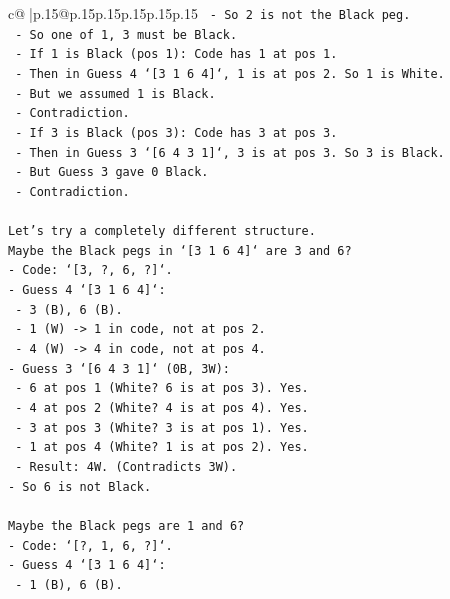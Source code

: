 \documentclass{article}
\begin{document}
{\begin{supertabular}{c@{$\;$}|p{.15\linewidth}@{}p{.15\linewidth}p{.15\linewidth}p{.15\linewidth}p{.15\linewidth}p{.15\linewidth}}
{{{\texttt{    {-} So 2 is not the Black peg.} \\
\texttt{    {-} So one of 1, 3 must be Black.} \\
\texttt{    {-} If 1 is Black (pos 1): Code has 1 at pos 1.} \\
\texttt{      {-} Then in Guess 4 `{[}3 1 6 4{]}`, 1 is at pos 2. So 1 is White.} \\
\texttt{      {-} But we assumed 1 is Black.} \\
\texttt{      {-} Contradiction.} \\
\texttt{    {-} If 3 is Black (pos 3): Code has 3 at pos 3.} \\
\texttt{      {-} Then in Guess 3 `{[}6 4 3 1{]}`, 3 is at pos 3. So 3 is Black.} \\
\texttt{      {-} But Guess 3 gave 0 Black.} \\
\texttt{      {-} Contradiction.} \\
\\ 
\texttt{Let's try a completely different structure.} \\
\texttt{Maybe the Black pegs in `{[}3 1 6 4{]}` are 3 and 6?} \\
\texttt{{-} Code: `{[}3, ?, 6, ?{]}`.} \\
\texttt{{-} Guess 4 `{[}3 1 6 4{]}`:} \\
\texttt{  {-} 3 (B), 6 (B).} \\
\texttt{  {-} 1 (W) {-}> 1 in code, not at pos 2.} \\
\texttt{  {-} 4 (W) {-}> 4 in code, not at pos 4.} \\
\texttt{{-} Guess 3 `{[}6 4 3 1{]}` (0B, 3W):} \\
\texttt{  {-} 6 at pos 1 (White? 6 is at pos 3). Yes.} \\
\texttt{  {-} 4 at pos 2 (White? 4 is at pos 4). Yes.} \\
\texttt{  {-} 3 at pos 3 (White? 3 is at pos 1). Yes.} \\
\texttt{  {-} 1 at pos 4 (White? 1 is at pos 2). Yes.} \\
\texttt{  {-} Result: 4W. (Contradicts 3W).} \\
\texttt{{-} So 6 is not Black.} \\
\\ 
\texttt{Maybe the Black pegs are 1 and 6?} \\
\texttt{{-} Code: `{[}?, 1, 6, ?{]}`.} \\
\texttt{{-} Guess 4 `{[}3 1 6 4{]}`:} \\
\texttt{  {-} 1 (B), 6 (B).} \\
}}}
\end{supertabular}}
\end{document}
